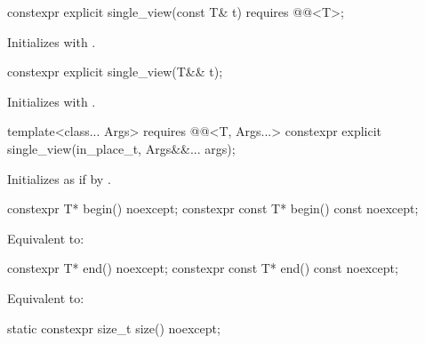 %
\begin{itemdecl}
constexpr explicit single_view(const T& t) requires @@<T>;
\end{itemdecl}

\begin{itemdescr}
\pnum
\effects
Initializes  with .
\end{itemdescr}

%
\begin{itemdecl}
constexpr explicit single_view(T&& t);
\end{itemdecl}

\begin{itemdescr}
\pnum
\effects
Initializes  with .
\end{itemdescr}

%
\begin{itemdecl}
template<class... Args>
  requires @@<T, Args...>
constexpr explicit single_view(in_place_t, Args&&... args);
\end{itemdecl}

\begin{itemdescr}
\pnum
\effects
Initializes  as if by
.
\end{itemdescr}

%
\begin{itemdecl}
constexpr T* begin() noexcept;
constexpr const T* begin() const noexcept;
\end{itemdecl}

\begin{itemdescr}
\pnum
\effects
Equivalent to: 
\end{itemdescr}

%
\begin{itemdecl}
constexpr T* end() noexcept;
constexpr const T* end() const noexcept;
\end{itemdecl}

\begin{itemdescr}
\pnum
\effects
Equivalent to: 
\end{itemdescr}

%
\begin{itemdecl}
static constexpr size_t size() noexcept;
\end{itemdecl}

